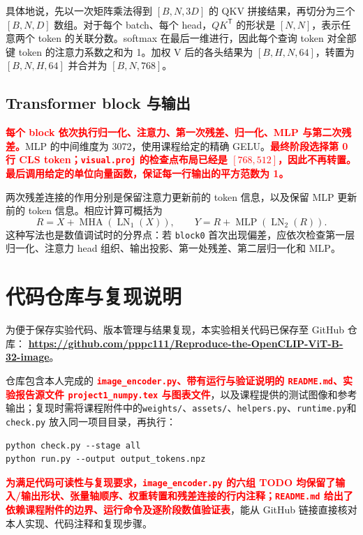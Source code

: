 \documentclass[a4paper,12pt]{article}
\newcommand{\studenthighlight}[1]{\textcolor{red}{\textbf{#1}}}
\begin{document}
具体地说，先以一次矩阵乘法得到 $[B,N,3D]$ 的 QKV 拼接结果，再切分为三个 $[B,N,D]$ 数组。对于每个 batch、每个 head，$QK^{\mathsf T}$ 的形状是 $[N,N]$，表示任意两个 token 的关联分数。softmax 在最后一维进行，因此每个查询 token 对全部键 token 的注意力系数之和为 1。加权 V 后的各头结果为 $[B,H,N,64]$，转置为 $[B,N,H,64]$ 并合并为 $[B,N,768]$。

\subsection{Transformer block 与输出}

\studenthighlight{每个 block 依次执行归一化、注意力、第一次残差、归一化、MLP 与第二次残差。}MLP 的中间维度为 3072，使用课程给定的精确 GELU。\studenthighlight{最终阶段选择第 0 行 CLS token；\texttt{visual.proj} 的检查点布局已经是 $[768,512]$，因此不再转置。最后调用给定的单位向量函数，保证每一行输出的平方范数为 1。}

两次残差连接的作用分别是保留注意力更新前的 token 信息，以及保留 MLP 更新前的 token 信息。相应计算可概括为
\[
R=X+\operatorname{MHA}(\operatorname{LN}_1(X)),\qquad
Y=R+\operatorname{MLP}(\operatorname{LN}_2(R)).
\]
这种写法也是数值调试时的分界点：若 \texttt{block0} 首次出现偏差，应依次检查第一层归一化、注意力 head 组织、输出投影、第一处残差、第二层归一化和 MLP。

\section{代码仓库与复现说明}

为便于保存实验代码、版本管理与结果复现，本实验相关代码已保存至 GitHub 仓库：
\studenthighlight{\url{https://github.com/pppc111/Reproduce-the-OpenCLIP-ViT-B-32-image}}。

仓库包含本人完成的 \studenthighlight{\texttt{image\_encoder.py}、带有运行与验证说明的 \texttt{README.md}、实验报告源文件 \texttt{project1\_numpy.tex} 与图表文件}，以及课程提供的测试图像和参考输出；复现时需将课程附件中的\texttt{weights/}、\texttt{assets/}、\texttt{helpers.py}、\texttt{runtime.py}和 \texttt{check.py} 放入同一项目目录，再执行：
\begin{verbatim}
python check.py --stage all
python run.py --output output_tokens.npz
\end{verbatim}


\studenthighlight{为满足代码可读性与复现要求，\texttt{image\_encoder.py} 的六组 TODO 均保留了输入/输出形状、张量轴顺序、权重转置和残差连接的行内注释；\texttt{README.md} 给出了依赖课程附件的边界、运行命令及逐阶段数值验证表}，能从 GitHub 链接直接核对本人实现、代码注释和复现步骤。
\end{document}
